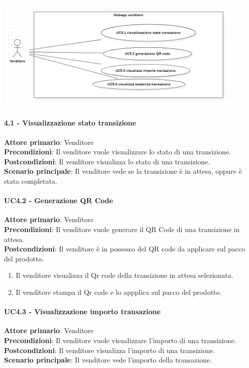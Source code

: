 \documentclass[a4paper, 12pt]{article}
\begin{document}
\includegraphics[width=0.9\textwidth]{UseCase_venditore4.png}

\paragraph{4.1 - Visualizzazione stato transizione}
\textbf{Attore primario}: Venditore\\
\textbf{Precondizioni}: Il venditore vuole visualizzare lo stato di una transizione.\\
\textbf{Postcondizioni}: Il venditore visualizza lo stato di una transizione.\\
\textbf{Scenario principale}: Il venditore vede se la transizione è in attesa, oppure è stata completata.\\

\paragraph{UC4.2 - Generazione QR Code}
\textbf{Attore primario}: Venditore\\
\textbf{Precondizioni}: Il venditore vuole generare il QR Code di una transizione in attesa.\\
\textbf{Postcondizioni}: Il venditore è in possesso del QR code da applicare sul pacco del prodotto.\\
\begin{enumerate}
\item Il venditore visualizza il Qr code della transizione in attesa selezionata.
\item Il venditore stampa il Qr code e lo appplica sul pacco del prodotto.
\end{enumerate}

\paragraph{UC4.3 - Visualizzazione importo transazione}
\textbf{Attore primario}: Venditore\\
\textbf{Precondizioni}: Il venditore vuole visualizzare l'importo di una transizione.\\
\textbf{Postcondizioni}: Il venditore visualizza l'importo di una transizione.\\
\textbf{Scenario principale}: Il venditore vede l'importo della transazione.\\
\end{document}
